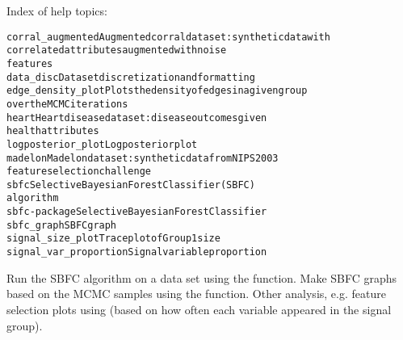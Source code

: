 \documentclass[a4paper]{book}
\begin{document}
%
\begin{Details}\relax


Index of help topics:
\begin{alltt}
corral_augmented        Augmented corral data set: synthetic data with
                        correlated attributes augmented with noise
                        features
data_disc               Data set discretization and formatting
edge_density_plot       Plots the density of edges in a given group
                        over the MCMC iterations
heart                   Heart disease data set: disease outcomes given
                        health attributes
logposterior_plot       Log posterior plot
madelon                 Madelon data set: synthetic data from NIPS 2003
                        feature selection challenge
sbfc                    Selective Bayesian Forest Classifier (SBFC)
                        algorithm
sbfc-package            Selective Bayesian Forest Classifier
sbfc_graph              SBFC graph
signal_size_plot        Trace plot of Group 1 size
signal_var_proportion   Signal variable proportion
\end{alltt}

Run the SBFC algorithm on a data set using the  function.
Make SBFC graphs based on the MCMC samples using the  function.
Other analysis, e.g. feature selection plots using  (based on how often each variable appeared in the signal group).
\end{Details}
\end{document}
